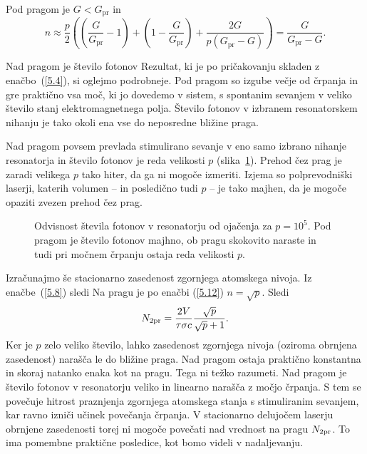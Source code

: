 Pod pragom je $G<G_\mathrm{pr}$ in 
\begin{equation}
n\approx \frac{p}{2}\left( \left(\frac{G}{G_\mathrm{pr}}-1\right)+\left(1
-\frac{G}{G_\mathrm{pr}}\right)+\frac{2G}{p(G_\mathrm{pr}-G)}\right) =\frac{G}{G_\mathrm{pr}-G}.
\label{5.13}
\end{equation}

Nad pragom je
število fotonov 
Rezultat, ki je po pričakovanju skladen z enačbo~(\ref{5.4}), si oglejmo podrobneje. 
Pod pragom so izgube večje od črpanja in gre praktično vsa moč, ki jo dovedemo v sistem, 
s spontanim sevanjem v veliko število stanj elektromagnetnega polja. 
Število fotonov v izbranem resonatorskem nihanju je tako okoli 
ena vse do neposredne bližine praga. 

Nad pragom povsem prevlada stimulirano sevanje 
v eno samo izbrano nihanje resonatorja in število fotonov je reda velikosti $p$ (slika~\ref{fig:p}).
Prehod čez prag je zaradi velikega $p$ tako hiter, da ga ni mogoče izmeriti.
Izjema so polprevodniški laserji, katerih 
volumen -- in posledično tudi $p$ -- 
je tako majhen, da je mogoče opaziti zvezen prehod čez prag.
\begin{figure}[ht]
\centering
\def\svgwidth{50truemm} 

\caption{Odvisnost števila fotonov v resonatorju od ojačenja za $p=10^5$. 
Pod pragom je število fotonov majhno, ob pragu skokovito naraste in tudi 
pri močnem črpanju ostaja reda velikosti $p$.}
\label{fig:p}
\end{figure}

Izračunajmo še stacionarno zasedenost zgornjega atomskega nivoja. Iz 
enačbe~(\ref{5.8}) sledi
Na pragu je po enačbi (\ref{5.12}) $n=\sqrt{p}$. 
Sledi 
\begin{equation}  
N_{\rm 2pr}=\frac{2V}{\tau \sigma c}\frac{\sqrt{p}}{\sqrt{p}+1}.
\label{5.16}
\end{equation}
Ker je $p$ zelo veliko število, lahko zasedenost zgornjega
nivoja (oziroma obrnjena zasedenost) narašča le do bližine praga. Nad pragom ostaja praktično
konstantna in skoraj natanko enaka kot na pragu. Tega ni težko razumeti. Nad
pragom je število fotonov v resonatorju veliko in linearno narašča 
z močjo črpanja. S tem se povečuje hitrost praznjenja zgornjega atomskega 
stanja s stimuliranim sevanjem, kar ravno izniči učinek povečanja črpanja. 
V stacionarno delujočem laserju obrnjene zasedenosti torej ni mogoče povečati 
nad vrednost na pragu $N_{\rm 2pr}$. To ima pomembne praktične posledice, kot bomo
videli v nadaljevanju.


